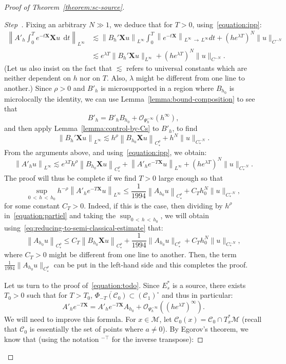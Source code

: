 \documentclass[AHL,Unicode,longabstracts,published]{cedram}
\newcommand{\X}{\mathbf{X}}
\newcommand{\mc}{\mathcal}
\newcommand{\M}{\mathcal{M}}
\newcommand{\clO}{\mathcal{O}}
\newcommand{\clC}{\mathcal{C}}
\newcommand{\dd}{\mathrm{d}}
\newcounter{stepcount}
\newenvironment{step}{\refstepcounter{stepcount}\begin{proof}[Step~\thestepcount]}{\let\qed\relax\end{proof}}
\begin{document}
\begin{proof}[Proof of Theorem~\ref{theorem:sc-source}]
\begin{step}
Fixing an arbitrary $N \gg 1$, we deduce that for $T>0$, using~\eqref{equation:ipp}:
\begin{align*}
\left\| A'_h \int_0^T e^{-t \X} \X u~~\dd t \right\|_{L^\infty} & \lesssim \left\| B_h'\X u\right\|_{L^\infty} \int_0^T \left\| e^{-t \X}\right\|_{L^\infty\,\rightarrow\,L^\infty} dt + \left(he^{\lambda T}\right)^N \|u\|_{C^{-N}} \\
& \lesssim e^{\lambda T} \| B_h'\X u\|_{L^\infty} + \left(he^{\lambda T}\right)^N \|u\|_{C^{-N}}.
\end{align*}
(Let us also insist on the fact that $\lesssim$ refers to universal constants which are neither dependent on $h$ nor on $T$. Also, $\lambda$ might be different from one line to another.) Since $\rho>0$ and $B'_h$ is microsupported in a region where $B_{h_0}$ is microlocally the identity, we can use Lemma~\ref{lemma:bound-composition} to see that
\[
B'_h = B'_h B_{h_0} + \clO_{\Psi^{-\infty}_h}\left(h^\infty\right),
\]
and then apply Lemma~\ref{lemma:control-by-Cs} to $B'_h$, to find
\[
\left\|B_h' \X u \right\|_{L^\infty} \lesssim h^{\rho}\left\| B_{h_0}\X u\right\|_{C^\rho_\ast} + h^N\|u\|_{C_*^{-N}}.
\]
From the arguments above, and using~\eqref{equation:ipp}, we obtain:
\begin{equation}\label{equation:partiel}
\left\| A'_h u \right\|_{L^\infty} \lesssim e^{\lambda T} h^\rho \left\| B_{h_0}\X u \right\|_{C^\rho_\ast} + \left\| A'_h e^{-T\X} u\right\|_{L^\infty} + \left(he^{\lambda T}\right)^N\|u\|_{C_*^{-N}}.
\end{equation}
The proof will thus be complete if we find $T>0$ large enough so that
\begin{equation}\label{equation:todo}
\sup_{0\,<\,h\,<\,h_0} h^{-\rho} \left\| A'_h e^{-T\X} u\right\|_{L^\infty} \leq \frac{1}{1994} \left\| A_{h_0} u\right\|_{C^\rho_\ast} + C_T h_0^N \|u\|_{C_*^{-N}},
\end{equation}
for some constant $C_T > 0$. Indeed, if this is the case, then dividing by $h^\rho$ in~\eqref{equation:partiel} and taking the $\sup_{0\,<\,h\,<\,h_0}$, we will obtain using~\eqref{eq:reducing-to-semi-classical-estimate} that:
\[
\left\|A_{h_0} u\right\|_{C^\rho_*} \leq C_T \left\|B_{h_0} \X u \right\|_{C^\rho_\ast} + \frac{1}{1994} \| A_{h_0} u\|_{C^\rho_\ast} + C_T h_0^N \|u\|_{C_*^{-N}},
\]
where $C_T\!>\!0$ might be different from one line to another. Then, the term $\frac{1}{1994}\!\| A_{h_0} u\|_{C^\rho_\ast}$ can be put in the left-hand side and this completes the proof.

Let us turn to the proof of~\eqref{equation:todo}. Since $E^\ast_s$ is a source, there exists $T_0>0$ such that for $T>T_0$, $\overline{\Phi_{-T}(\clC_0)} \subset (\clC_1)^{\circ}$ and thus in particular:
\[
A'_h e^{-T\X} = A'_h e^{-T \X} A_{h_0} + \mc{O}_{\Psi^{-\infty}_h}\left(\left(he^{\lambda T}\right)^\infty\right).
\]
We will need to improve this formula. For $x\in\M$, let $\clC_0(x)=\clC_0\cap T_x^*\M$ (recall that $\clC_0$ is essentially the set of points where $a\neq 0$). By Egorov's theorem, we know that (using the notation ${}^{-\top}$ for the inverse transpose):


\end{step}
\end{proof}
\end{document}
